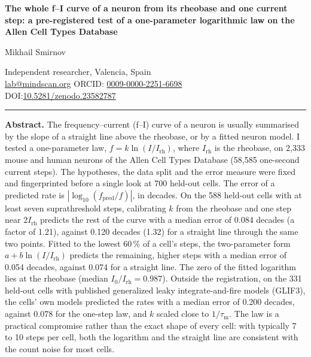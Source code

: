 \documentclass[12pt,a4paper]{article}
\newcommand{\Irh}{I_{\mathrm{rh}}}
\newcommand{\taum}{\tau_{\mathrm{m}}}
\newcommand{\lgt}{\log_{10}}
\begin{document}
\begin{flushleft}
{\LARGE\bfseries The whole f--I curve of a neuron from its rheobase and one current step: a pre-registered test of a one-parameter logarithmic law on the Allen Cell Types Database\par}
\vspace{12pt}
{\large Mikhail Smirnov\par}
\vspace{3pt}
{\small Independent researcher, Valencia, Spain\\
\href{mailto:lab@mindscan.org}{lab@mindscan.org} \quad ORCID: \href{https://orcid.org/0009-0000-2251-6698}{0009-0000-2251-6698}\\
DOI:\href{https://doi.org/10.5281/zenodo.23582787}{10.5281/zenodo.23582787}\par}
\end{flushleft}
\vspace{6pt}

\noindent\rule{\textwidth}{0.4pt}
\vspace{2pt}

\noindent\textbf{Abstract.} The frequency--current (f--I) curve of a neuron is usually summarised by the slope of a straight line above the rheobase, or by a fitted neuron model. I tested a one-parameter law, $f = k\ln(I/\Irh)$, where $\Irh$ is the rheobase, on 2,333 mouse and human neurons of the Allen Cell Types Database (58,585 one-second current steps). The hypotheses, the data split and the error measure were fixed and fingerprinted before a single look at 700 held-out cells. The error of a predicted rate is $|\lgt(f_{\mathrm{pred}}/f)|$, in decades. On the 588 held-out cells with at least seven suprathreshold steps, calibrating $k$ from the rheobase and one step near $2\Irh$ predicts the rest of the curve with a median error of 0.084 decades (a factor of 1.21), against 0.120 decades (1.32) for a straight line through the same two points. Fitted to the lowest 60\,\% of a cell's steps, the two-parameter form $a + b\ln(I/\Irh)$ predicts the remaining, higher steps with a median error of 0.054 decades, against 0.074 for a straight line. The zero of the fitted logarithm lies at the rheobase (median $I_0/\Irh = 0.987$). Outside the registration, on the 331 held-out cells with published generalized leaky integrate-and-fire models (GLIF3), the cells' own models predicted the rates with a median error of 0.200 decades, against 0.078 for the one-step law, and $k$ scaled close to $1/\taum$. The law is a practical compromise rather than the exact shape of every cell: with typically 7 to 10 steps per cell, both the logarithm and the straight line are consistent with the count noise for most cells.
\end{document}
